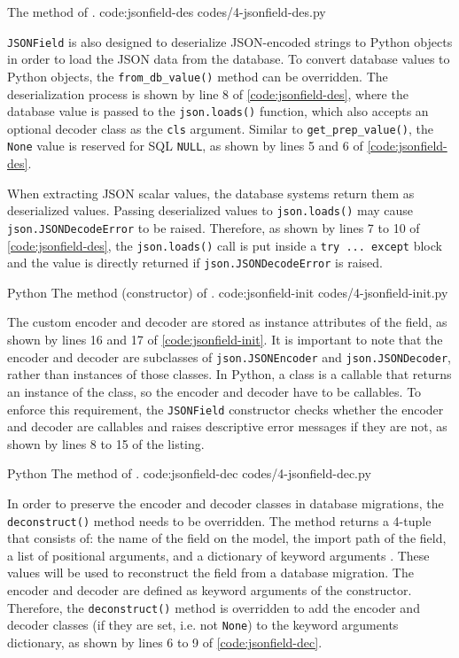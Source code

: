 {The  method of .}
{code:jsonfield-des}
{codes/4-jsonfield-des.py}

\verb|JSONField| is also designed to deserialize JSON-encoded strings to Python
objects in order to load the JSON data from the database. To convert database
values to Python objects, the \verb|from_db_value()| method can be overridden.
The deserialization process is shown by line 8 of \autoref{code:jsonfield-des},
where the database value is passed to the \verb|json.loads()| function, which
also accepts an optional decoder class as the \verb|cls| argument. Similar to
\verb|get_prep_value()|, the \verb|None| value is reserved for SQL \verb|NULL|,
as shown by lines 5 and 6 of \autoref{code:jsonfield-des}.

When extracting JSON scalar values, the database systems return them as
deserialized values. Passing deserialized values to \verb|json.loads()| may
cause \verb|json.JSONDecodeError| to be raised. Therefore, as shown by lines 7
to 10 of \autoref{code:jsonfield-des}, the \verb|json.loads()| call is put
inside a \verb|try ... except| block and the value is directly returned if
\verb|json.JSONDecodeError| is raised.

\listing
{Python}
{The  method (constructor) of .}
{code:jsonfield-init}
{codes/4-jsonfield-init.py}

The custom encoder and decoder are stored as instance attributes of the field,
as shown by lines 16 and 17 of \autoref{code:jsonfield-init}. It is important
to note that the encoder and decoder are subclasses of \verb|json.JSONEncoder|
and \verb|json.JSONDecoder|, rather than instances of those classes. In Python,
a class is a callable that returns an instance of the class, so the encoder and
decoder have to be callables. To enforce this requirement, the \verb|JSONField|
constructor checks whether the encoder and decoder are callables and raises
descriptive error messages if they are not, as shown by lines 8 to 15 of the
listing.

\listing
{Python}
{The  method of .}
{code:jsonfield-dec}
{codes/4-jsonfield-dec.py}

In order to preserve the encoder and decoder classes in database migrations,
the \verb|deconstruct()| method needs to be overridden. The method returns a
4-tuple that consists of: the name of the field on the model, the import path
of the field, a list of positional arguments, and a dictionary of keyword
arguments \cite{django:model_fields}. These values will be used to reconstruct
the field from a database migration. The encoder and decoder are defined as
keyword arguments of the constructor. Therefore, the \verb|deconstruct()|
method is overridden to add the encoder and decoder classes (if they are set,
i.e. not \verb|None|) to the keyword arguments dictionary, as shown by lines 6
to 9 of \autoref{code:jsonfield-dec}.

